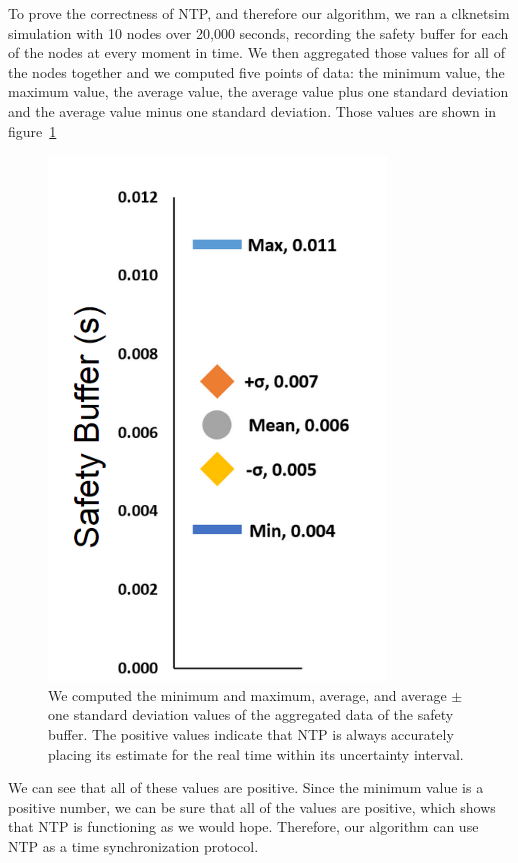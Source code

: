 To prove the correctness of NTP, and therefore our algorithm, we ran a
clknetsim simulation with 10 nodes over 20,000 seconds, 
recording the safety buffer for each of the nodes at
every moment in time. We then aggregated those values for all of the
nodes together and we computed five points of data: the minimum value,
the maximum value, the average value, the average value plus one
standard deviation and the average value minus one standard
deviation. Those values are shown in figure~\ref{fig:safety-data}

\begin{figure}[h]
  \caption{We computed the minimum and maximum, average, and average $\pm$ one standard deviation values of the aggregated data of the safety buffer. The positive values indicate that NTP is always accurately placing its estimate for the real time within its uncertainty interval.}
  \label{fig:safety-data}
  \centering
  \includegraphics[width=0.8\textwidth]{safety-data.png}
\end{figure}

We can see that all of these values are positive. Since the minimum
value is a positive number, we can be sure that all of the values are
positive, which shows that NTP is functioning as we would
hope. Therefore, our algorithm can use NTP as a time synchronization
protocol.

